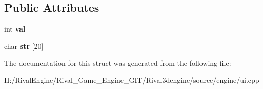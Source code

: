 \subsection*{Public Attributes}
\begin{DoxyCompactItemize}
\item 
\mbox{\label{struct_u_i_1_1_text_int_a54119c359fcd5c81db17f976e2502786}} 
int {\bfseries val}
\item 
\mbox{\label{struct_u_i_1_1_text_int_a0f03762fe6c430f710b5949ef821a019}} 
char {\bfseries str} \mbox{[}20\mbox{]}
\end{DoxyCompactItemize}


The documentation for this struct was generated from the following file\+:\begin{DoxyCompactItemize}
\item 
H\+:/\+Rival\+Engine/\+Rival\+\_\+\+Game\+\_\+\+Engine\+\_\+\+G\+I\+T/\+Rival3dengine/source/engine/ui.\+cpp\end{DoxyCompactItemize}
